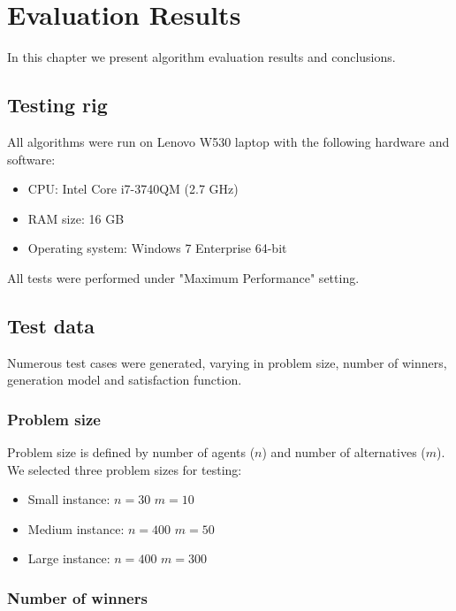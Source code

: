 \chapter{Evaluation Results}
\label{cha:evaluationResults}

In this chapter we present algorithm evaluation results and conclusions.

\section{Testing rig}

All algorithms were run on Lenovo W530 laptop with the following hardware and software:

\begin{itemize}
	\item CPU: Intel Core i7-3740QM (2.7 GHz)
	\item RAM size: 16 GB
	\item Operating system: Windows 7 Enterprise 64-bit
\end{itemize}

All tests were performed under "Maximum Performance" setting.

\section{Test data}

Numerous test cases were generated, varying in problem size, number of winners, generation model and satisfaction function.

\subsection{Problem size}

Problem size is defined by number of agents ($n$) and number of alternatives ($m$). We selected three problem sizes for testing:

\begin{itemize}
	\item Small instance: $n = 30$ $m = 10$
	\item Medium instance: $n = 400$ $m = 50$
	\item Large instance: $n = 400$ $m = 300$
\end{itemize}

\subsection{Number of winners}

